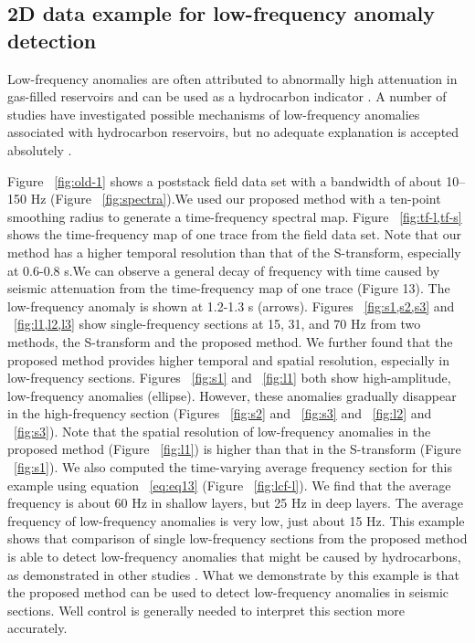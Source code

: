  \subsection{2D data example for low-frequency anomaly detection}
 

Low-frequency anomalies are often attributed to abnormally high
attenuation in gas-filled reservoirs and can be used as a hydrocarbon
indicator \cite[]{Castagna2003}. A number of studies have investigated
possible mechanisms of low-frequency anomalies associated
with hydrocarbon reservoirs, but no adequate explanation is
accepted absolutely \cite[]{Ebrom2004, Kazemeini2009}.

Figure ~\ref{fig:old-1} shows a poststack field data set with a bandwidth of
about 10–150 Hz (Figure ~\ref{fig:spectra}).We used our proposed method with a
ten-point smoothing radius to generate a time-frequency spectral
map. Figure ~\ref{fig:tf-l,tf-s} shows the time-frequency map of one trace from
the field data set. Note that our method has a higher temporal resolution
than that of the S-transform, especially at 0.6-0.8 s.We can
observe a general decay of frequency with time caused by seismic
attenuation from the time-frequency map of one trace (Figure 13).
The low-frequency anomaly is shown at 1.2-1.3 s (arrows).
Figures ~\ref{fig:s1,s2,s3} and ~\ref{fig:l1,l2,l3} show single-frequency sections at 15, 31, and
70 Hz from two methods, the S-transform and the proposed method.
We further found that the proposed method provides higher temporal
and spatial resolution, especially in low-frequency sections.
Figures ~\ref{fig:s1} and ~\ref{fig:l1} both show high-amplitude, low-frequency
anomalies (ellipse). However, these anomalies gradually disappear
in the high-frequency section (Figures ~\ref{fig:s2} and ~\ref{fig:s3} and ~\ref{fig:l2}
and ~\ref{fig:s3}). Note that the spatial resolution of low-frequency anomalies
in the proposed method (Figure ~\ref{fig:l1}) is higher than that in the
S-transform (Figure ~\ref{fig:s1}). We also computed the time-varying
average frequency section for this example using equation ~\ref{eq:eq13}
(Figure ~\ref{fig:lcf-l}). We find that the average frequency is about 60 Hz
in shallow layers, but 25 Hz in deep layers. The average frequency
of low-frequency anomalies is very low, just about 15 Hz. This
example shows that comparison of single low-frequency sections
from the proposed method is able to detect low-frequency anomalies
that might be caused by hydrocarbons, as demonstrated in other
studies \cite[]{Castagna2003, Korneev2004, Zhenhua2008}. What we demonstrate by this example is that the proposed
method can be used to detect low-frequency anomalies in seismic
sections. Well control is generally needed to interpret this section
more accurately.

